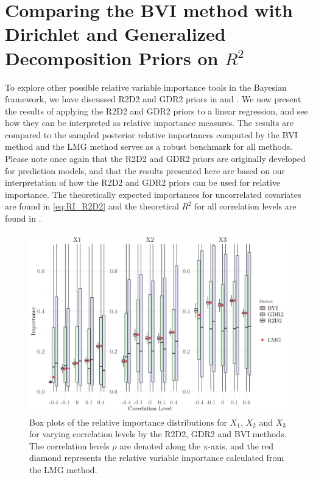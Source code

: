 \section{Comparing the BVI method with Dirichlet and Generalized Decomposition Priors on \texorpdfstring{$R^2$}{Lg}}
To explore other possible relative variable importance tools in the Bayesian framework, we have discussed R2D2 and GDR2 priors in  and . We now present the results of applying the R2D2 and GDR2 priors to a linear regression, and see how they can be interpreted as relative importance measures. The results are compared to the sampled posterior relative importances computed by the BVI method and the LMG method serves as a robust benchmark for all methods. Please note once again that the R2D2 and GDR2 priors are originally developed for prediction models, and that the results presented here are based on our interpretation of how the R2D2 and GDR2 priors can be used for relative importance. The theoretically expected importances for uncorrelated covariates are found in \eqref{eq:RI_R2D2} and the theoretical $R^2$ for all correlation levels are found in . 
\begin{figure}[H]%
  \centering
  \includegraphics[width=1\linewidth]{Figures/R2D2_BVI_Comparison/R2D2_BVI_boxplot.png}
  \caption[Comparison of the relative importance from the BVI method and the shrinkage prior methods]{Box plots of the relative importance distributions for $X_1$, $X_2$ and $X_3$ for varying correlation levels by the R2D2, GDR2 and BVI methods. The correlation levels $\rho$ are denoted along the x-axis, and the red diamond represents the relative variable importance calculated from the LMG method.}
  \label{fig:r2d2_importance}
\end{figure}
